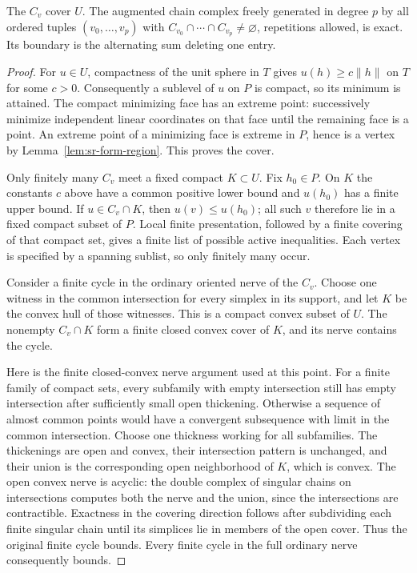 \begin{srlemma}\label{lem:sr-normal-acyclic}
The \(C_v\) cover \(U\).
The augmented chain complex freely generated in degree \(p\) by all
ordered tuples \((v_0,\ldots,v_p)\) with
\(C_{v_0}\cap\cdots\cap C_{v_p}\ne\varnothing\), repetitions allowed,
is exact. Its boundary is the alternating sum deleting one entry.
\end{srlemma}
\begin{proof}
For \(u\in U\), compactness of the unit sphere in \(T\) gives
\(u(h)\geq c\|h\|\) on \(T\) for some \(c>0\).
Consequently a sublevel of \(u\) on \(P\) is compact, so its minimum
is attained. The compact minimizing face has an extreme point:
successively minimize independent linear coordinates on that face
until the remaining face is a point. An extreme point of a
minimizing face is extreme in \(P\), hence is a vertex by
Lemma~\ref{lem:sr-form-region}. This proves the cover.

Only finitely many \(C_v\) meet a fixed compact \(K\subset U\).
Fix \(h_0\in P\). On \(K\) the constants \(c\) above have a common
positive lower bound and \(u(h_0)\) has a finite upper bound.
If \(u\in C_v\cap K\), then \(u(v)\leq u(h_0)\); all such \(v\)
therefore lie in a fixed compact subset of \(P\).
Local finite presentation, followed by a finite covering of that
compact set, gives a finite list of possible active inequalities.
Each vertex is specified by a spanning sublist, so only finitely
many occur.

Consider a finite cycle in the ordinary oriented nerve of the
\(C_v\). Choose one witness in the common intersection for every
simplex in its support, and let \(K\) be the convex hull of those
witnesses. This is a compact convex subset of \(U\).
The nonempty \(C_v\cap K\) form a finite closed convex cover of \(K\),
and its nerve contains the cycle.

Here is the finite closed-convex nerve argument used at this point.
For a finite family of compact sets, every subfamily with empty
intersection still has empty intersection after sufficiently small
open thickening. Otherwise a sequence of almost common points would
have a convergent subsequence with limit in the common intersection.
Choose one thickness working for all subfamilies.
The thickenings are open and convex, their intersection pattern is
unchanged, and their union is the corresponding open neighborhood
of \(K\), which is convex. The open convex nerve is acyclic:
the double complex of singular chains on intersections computes
both the nerve and the union, since the intersections are
contractible. Exactness in the covering direction follows after
subdividing each finite singular chain until its simplices lie in
members of the open cover. Thus the original finite cycle bounds.
Every finite cycle in the full ordinary nerve consequently bounds.


\end{proof}
